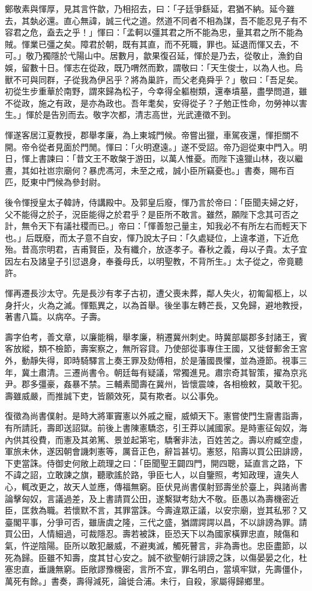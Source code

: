 \begin{pinyinscope}
鄭敬素與惲厚，見其言忤歙，乃相招去，曰：「子廷爭繇延，君猶不納。延今雖去，其埶必還。直心無諱，誠三代之道。然道不同者不相為謀，吾不能忍見子有不容君之危，盍去之乎！」惲曰：「孟軻以彊其君之所不能為忠，量其君之所不能為賊。惲業已彊之矣。障君於朝，既有其直，而不死職，罪也。延退而惲又去，不可。」敬乃獨隱於弋陽山中。居數月，歙果復召延，惲於是乃去，從敬止，漁釣自娛，留數十日。惲志在從政，既乃喟然而歎，謂敬曰：「天生俊士，以為人也。烏獸不可與同群，子從我為伊呂乎？將為巢許，而父老堯舜乎？」敬曰：「吾足矣。初從生步重華於南野，謂來歸為松子，今幸得全軀樹類，還奉墳墓，盡學問道，雖不從政，施之有政，是亦為政也。吾年耄矣，安得從子？子勉正性命，勿勞神以害生。」惲於是告別而去。敬字次都，清志高世，光武連徵不到。

惲遂客居江夏教授，郡舉孝廉，為上東城門候。帝嘗出獵，車駕夜還，惲拒關不開。帝令從者見面於門閒。惲曰：「火明遼遠。」遂不受詔。帝乃迴從東中門入。明日，惲上書諫曰：「昔文王不敢槃于游田，以萬人惟憂。而陛下遠獵山林，夜以繼晝，其如社岜宗廟何？暴虎馮河，未至之戒，誠小臣所竊憂也。」書奏，賜布百匹，貶東中門候為參封尉。

後令惲授皇太子韓詩，侍講殿中。及郭皇后廢，惲乃言於帝曰：「臣聞夫婦之好，父不能得之於子，況臣能得之於君乎？是臣所不敢言。雖然，願陛下念其可否之計，無令天下有議社稷而已。」帝曰：「惲善恕己量主，知我必不有所左右而輕天下也。」后既廢，而太子意不自安，惲乃說太子曰：「久處疑位，上違孝道，下近危殆。昔高宗明君，吉甫賢臣，及有纖介，放逐孝子。春秋之義，母以子貴。太子宜因左右及諸皇子引愆退身，奉養母氏，以明聖教，不背所生。」太子從之，帝竟聽許。

惲再遷長沙太守。先是長沙有孝子古初，遭父喪未葬，鄰人失火，初匍匐柩上，以身扞火，火為之滅。惲甄異之，以為首舉。後坐事左轉芒長，又免歸，避地教授，著書八篇。以病卒。子壽。

壽字伯考，善文章，以廉能稱，舉孝廉，稍遷冀州刺史。時冀部屬郡多封諸王，賓客放縱，類不檢節，壽案察之，無所容貸。乃使部從事專住王國，又徙督郵舍王宮外，動靜失得，即時騎驛言上奏王罪及劾傅相，於是藩國畏懼，並為遵節。視事三年，冀土肅清。三遷尚書令。朝廷每有疑議，常獨進見。肅宗奇其智策，擢為京兆尹。郡多彊豪，姦暴不禁。三輔素聞壽在冀州，皆懷震竦，各相檢敕，莫敢干犯。壽雖威嚴，而推誠下吏，皆願效死，莫有欺者。以公事免。

復徵為尚書僕射。是時大將軍竇憲以外戚之寵，威傾天下。憲嘗使門生齎書詣壽，有所請託，壽即送詔獄。前後上書陳憲驕恣，引王莽以誡國家。是時憲征匈奴，海內供其役費，而憲及其弟篤、景並起第宅，驕奢非法，百姓苦之。壽以府臧空虛，軍旅未休，遂因朝會譏刺憲等，厲音正色，辭旨甚切。憲怒，陷壽以買公田誹謗，下吏當誅。侍御史何敞上疏理之曰：「臣聞聖王闢四門，開四聰，延直言之路，下不諱之詔，立敢諫之旗，聽歌謠於路，爭臣七人，以自鑒照，考知政理，違失人心，輒改更之，故天人並應，傳福無窮。臣伏見尚書僕射郅壽坐於臺上，與諸尚書論擊匈奴，言議過差，及上書請買公田，遂繫獄考劾大不敬。臣愚以為壽機密近臣，匡救為職。若懷默不言，其罪當誅。今壽違眾正議，以安宗廟，豈其私邪？又臺閣平事，分爭可否，雖唐虞之隆，三代之盛，猶謂諤諤以昌，不以誹謗為罪。請買公田，人情細過，可裁隱忍。壽若被誅，臣恐天下以為國家橫罪忠直，賊傷和氣，忤逆陰陽。臣所以敢犯嚴威，不避夷滅，觸死瞽言，非為壽也。忠臣盡節，以死為歸。臣雖不知壽，度其甘心安之。誠不欲聖朝行誹謗之誅，以傷晏晏之化，杜塞忠直，垂譏無窮。臣敞謬豫機密，言所不宜，罪名明白，當填牢獄，先壽僵仆，萬死有餘。」書奏，壽得減死，論徙合浦。未行，自殺，家屬得歸鄉里。


\end{pinyinscope}
